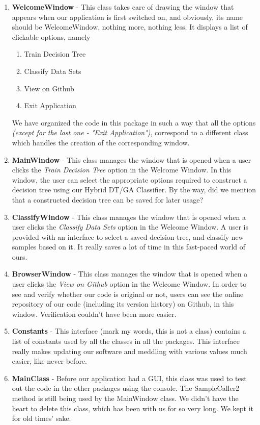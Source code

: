 \documentclass[12pt]{report}
\begin{document}
\begin{enumerate}

\item{\textbf{WelcomeWindow}} - This class takes care of drawing the window that appears when our application is first switched on, and obviously, its name should be WelcomeWindow, nothing more, nothing less. It displays a list of clickable options, namely
\begin{enumerate}
\item{Train Decision Tree}
\item{Classify Data Sets}
\item{View on Github}
\item{Exit Application}
\end{enumerate}

We have organized the code in this package in such a way that all the options \textit{(except for the last one - "Exit Application")}, correspond to a different class which handles the creation of the corresponding window.

\item{\textbf{MainWindow}} - This class manages the window that is opened when a user clicks the \textit{Train Decision Tree} option in the Welcome Window. In this window, the user can select the appropriate options required to construct a decision tree using our Hybrid DT/GA Classifier. By the way, did we mention that a constructed decision tree can be saved for later usage?

\item{\textbf{ClassifyWindow}} - This class manages the window that is opened when a user clicks the \textit{Classify Data Sets} option in the Welcome Window. A user is provided with an interface to select a saved decision tree, and classify new samples based on it. It really saves a lot of time in this fast-paced world of ours.


\item{\textbf{BrowserWindow}} - This class manages the window that is opened when a user clicks the \textit{View on Github} option in the Welcome Window. In order to see and verify whether our code is original or not, users can see the online repository of our code (including its version history) on Github, in this window. Verification couldn't have been more easier. 

\item{\textbf{Constants}} - This interface (mark my words, this is not a class) contains a list of constants used by all the classes in all the packages. This interface really makes updating our software and meddling with various values much easier, like never before.



\item{\textbf{MainClass}} - Before our application had a GUI, this class was used to test out the code in the other packages using the console. The SampleCaller2 method is still being used by the MainWindow class. We didn't have the heart to delete this class, which has been with us for so very long. We kept it for old times' sake.



\end{enumerate}
\end{document}
